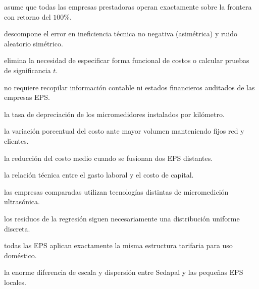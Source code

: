 \begin{opts}
    \item asume que todas las empresas prestadoras operan exactamente sobre la frontera con retorno del $100\%$.
    \item descompone el error en ineficiencia técnica no negativa (asimétrica) y ruido aleatorio simétrico.
    \item elimina la necesidad de especificar forma funcional de costos o calcular pruebas de significancia $t$.
    \item no requiere recopilar información contable ni estados financieros auditados de las empresas EPS.
\end{opts}

\begin{opts}
    \item la tasa de depreciación de los micromedidores instalados por kilómetro.
    \item la variación porcentual del costo ante mayor volumen manteniendo fijos red y clientes.
    \item la reducción del costo medio cuando se fusionan dos EPS distantes.
    \item la relación técnica entre el gasto laboral y el costo de capital.
\end{opts}

\begin{opts}
    \item las empresas comparadas utilizan tecnologías distintas de micromedición ultrasónica.
    \item los residuos de la regresión siguen necesariamente una distribución uniforme discreta.
    \item todas las EPS aplican exactamente la misma estructura tarifaria para uso doméstico.
    \item la enorme diferencia de escala y dispersión entre Sedapal y las pequeñas EPS locales.
\end{opts}

